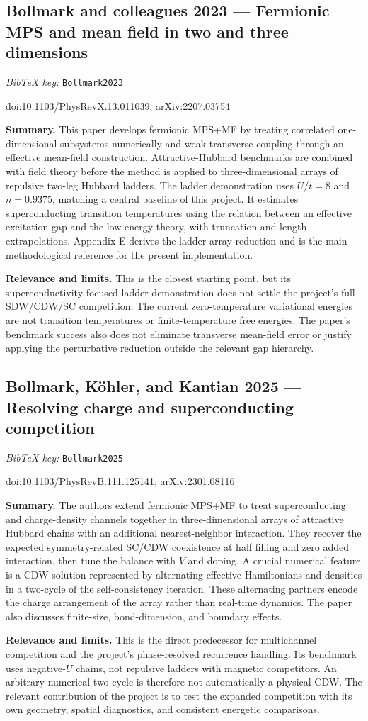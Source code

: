 \documentclass[11pt]{article}
\newcommand{\paper}[2]{\Needspace{8\baselineskip}\subsection{#2}\label{paper:#1}\textit{BibTeX key:} \texttt{#1}\quad\citep{#1}\par}
\newcommand{\doi}[1]{\href{https://doi.org/#1}{doi:#1}}
\newcommand{\arxiv}[1]{\href{https://arxiv.org/abs/#1}{arXiv:#1}}
\newcommand{\summary}{\par\textbf{Summary.} }
\newcommand{\relevance}{\par\textbf{Relevance and limits.} }
\begin{document}
\paper{Bollmark2023}{Bollmark and colleagues 2023 --- Fermionic MPS and mean field in two and three dimensions}
\doi{10.1103/PhysRevX.13.011039}; \arxiv{2207.03754}
\summary This paper develops fermionic MPS+MF by treating correlated one-dimensional subsystems numerically and weak transverse coupling through an effective mean-field construction. Attractive-Hubbard benchmarks are combined with field theory before the method is applied to three-dimensional arrays of repulsive two-leg Hubbard ladders. The ladder demonstration uses $U/t=8$ and $n=0.9375$, matching a central baseline of this project. It estimates superconducting transition temperatures using the relation between an effective excitation gap and the low-energy theory, with truncation and length extrapolations. Appendix E derives the ladder-array reduction and is the main methodological reference for the present implementation.
\relevance This is the closest starting point, but its superconductivity-focused ladder demonstration does not settle the project's full SDW/CDW/SC competition. The current zero-temperature variational energies are not transition temperatures or finite-temperature free energies. The paper's benchmark success also does not eliminate transverse mean-field error or justify applying the perturbative reduction outside the relevant gap hierarchy.

\paper{Bollmark2025}{Bollmark, K\"ohler, and Kantian 2025 --- Resolving charge and superconducting competition}
\doi{10.1103/PhysRevB.111.125141}; \arxiv{2301.08116}
\summary The authors extend fermionic MPS+MF to treat superconducting and charge-density channels together in three-dimensional arrays of attractive Hubbard chains with an additional nearest-neighbor interaction. They recover the expected symmetry-related SC/CDW coexistence at half filling and zero added interaction, then tune the balance with $V$ and doping. A crucial numerical feature is a CDW solution represented by alternating effective Hamiltonians and densities in a two-cycle of the self-consistency iteration. These alternating partners encode the charge arrangement of the array rather than real-time dynamics. The paper also discusses finite-size, bond-dimension, and boundary effects.
\relevance This is the direct predecessor for multichannel competition and the project's phase-resolved recurrence handling. Its benchmark uses negative-$U$ chains, not repulsive ladders with magnetic competitors. An arbitrary numerical two-cycle is therefore not automatically a physical CDW. The relevant contribution of the project is to test the expanded competition with its own geometry, spatial diagnostics, and consistent energetic comparisons.
\end{document}

